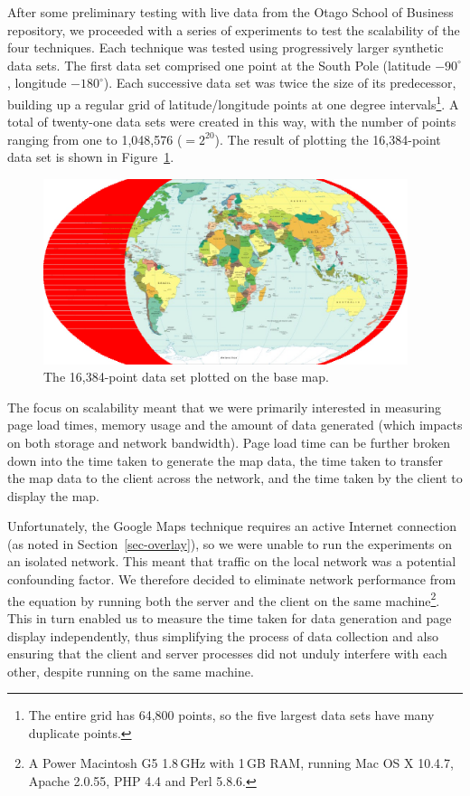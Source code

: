 \documentclass[acmtocl,acmnow]{acmtrans2m}
\begin{document}
After some preliminary testing with live data from the Otago School of
Business repository, we proceeded with a series of experiments to test
the scalability of the four techniques. Each technique was tested using
progressively larger synthetic data sets. The first data set comprised
one point at the South Pole (latitude \(-90^{\circ}\), longitude
\(-180^{\circ}\)). Each successive data set was twice the size of its
predecessor, building up a regular grid of latitude/longitude points at
one degree intervals\footnote{The entire grid has 64,800 points, so the
five largest data sets have many duplicate points.}. A total of
twenty-one data sets were created in this way, with the number of points
ranging from one to 1,048,576 (\(=2^{20}\)). The result of plotting the
16,384-point data set is shown in Figure~\ref{fig-grid-points}.


\begin{figure}
	\centering
	\includegraphics[width=0.95\textwidth,keepaspectratio]{16384_points}
	\caption{The 16,384-point data set plotted on the base map.}
	\label{fig-grid-points}
\end{figure}


The focus on scalability meant that we were primarily interested in
measuring page load times, memory usage and the amount of data
generated (which impacts on both storage and network bandwidth). Page
load time can be further broken down into the time taken to generate the
map data, the time taken to transfer the map data to the client across
the network, and the time taken by the client to display the map.

Unfortunately, the Google Maps technique requires an active Internet
connection (as noted in Section~\ref{sec-overlay}), so we were unable to
run the experiments on an isolated network. This meant that traffic on
the local network was a potential confounding factor. We therefore
decided to eliminate network performance from the equation by running
both the server and the client on the same machine\footnote{A Power
Macintosh G5 1.8\,GHz with 1\,GB RAM, running Mac OS X 10.4.7, Apache
2.0.55, PHP 4.4 and Perl 5.8.6.}. This in turn enabled us to measure the
time taken for data generation and page display independently, thus
simplifying the process of data collection and also ensuring that the
client and server processes did not unduly interfere with each other,
despite running on the same machine.
\end{document}

